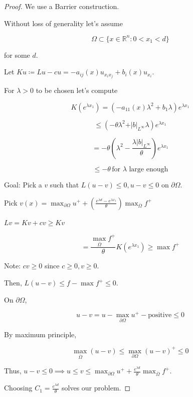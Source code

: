 \documentclass{article}
\theoremstyle{definition}
\begin{document}
\begin{proof}
    We use a Barrier construction.

    Without loss of generality let's assume

    \[
        \Omega \subset \{ x\in \mathbb{R}^n : 0 < x_1 < d \}
    \]

    for some \(d\).

    Let \(Ku \coloneqq Lu - cu = - a_{ij}(x) u_{x_i x_j} + b_i(x)u_{x_i}\).
    
    For \(\lambda > 0\) to be chosen let's compute

    \[
        K(e^{\lambda x_1}) = (- a_{11} (x) \lambda^2 + b_1 \lambda )e^{\lambda x_1} 
    \]

    \[
        \leq (-\theta \lambda^2 + \vert b \vert _{L^{\infty}}\lambda)e^{\lambda x_1}
    \]

    \[
        = - \theta \left( \lambda^2 - \frac{\lambda \vert b \vert _{L^{\infty}}}{\theta} \right) e^{\lambda x_1}
    \]

    \[
        \leq -\theta \, \text{for } \lambda \text{ large enough} 
    \]

    Goal: Pick a \(v\) such that \(L(u-v) \leq 0, u-v \leq 0\) on \(\partial \Omega\).

    Pick \(v(x) = \max_{\partial \Omega} u^+ + \left( \frac{e^{\lambda d} - e^{\lambda x_1}}{\theta} \right) \max_{\overline{\Omega}}f^+  \)
    
    \(Lv = Kv + cv \geq Kv\)
    
    \[
        = \frac{\max_{\overline{\Omega}}f^+}{\theta} K(e^{\lambda x_1}) \geq \max f^+
    \]

    Note: \(cv \geq 0\) since \(c \geq 0, v \geq 0\).

    Then, \(L(u-v) \leq f - \max f^+ \leq 0\).

    On \(\partial \Omega\),

    \[
        u - v = u - \max_{\partial \Omega} u^+ - \text{positive} \leq 0 
    \]

    By maximum principle,

    \[
        \max_{\overline{\Omega}} (u-v) \leq \max_{\partial \Omega} (u-v)^+ \leq 0
    \]

    Thus, \(u -v \leq 0 \implies u \leq v \leq \max_{\partial \Omega} u^+ + \frac{e^{\lambda d}}{\theta} \max_{\overline{\Omega}} f^+\).

    Choosing \(C_1 = \frac{e^{\lambda d}}{\theta}\) solves our problem.
\end{proof}
\end{document}
